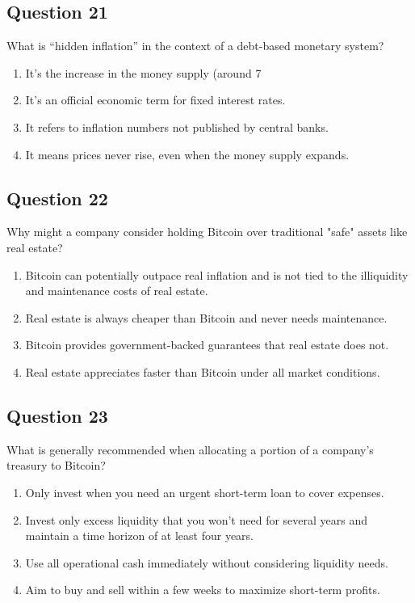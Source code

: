 \documentclass[12pt,a4paper]{article}
\begin{document}
\bigskip


\subsection*{Question 21}
What is “hidden inflation” in the context of a debt-based monetary system?

\begin{enumerate}[label=\Alph*., leftmargin=*]
\item It’s the increase in the money supply (around 7%
\item It’s an official economic term for fixed interest rates.
\item It refers to inflation numbers not published by central banks.
\item It means prices never rise, even when the money supply expands.
\end{enumerate}

\bigskip


\subsection*{Question 22}
Why might a company consider holding Bitcoin over traditional "safe" assets like real estate?

\begin{enumerate}[label=\Alph*., leftmargin=*]
\item Bitcoin can potentially outpace real inflation and is not tied to the illiquidity and maintenance costs of real estate.
\item Real estate is always cheaper than Bitcoin and never needs maintenance.
\item Bitcoin provides government-backed guarantees that real estate does not.
\item Real estate appreciates faster than Bitcoin under all market conditions.
\end{enumerate}

\bigskip


\subsection*{Question 23}
What is generally recommended when allocating a portion of a company’s treasury to Bitcoin?

\begin{enumerate}[label=\Alph*., leftmargin=*]
\item Only invest when you need an urgent short-term loan to cover expenses.
\item Invest only excess liquidity that you won’t need for several years and maintain a time horizon of at least four years.
\item Use all operational cash immediately without considering liquidity needs.
\item Aim to buy and sell within a few weeks to maximize short-term profits.
\end{enumerate}
\end{document}
